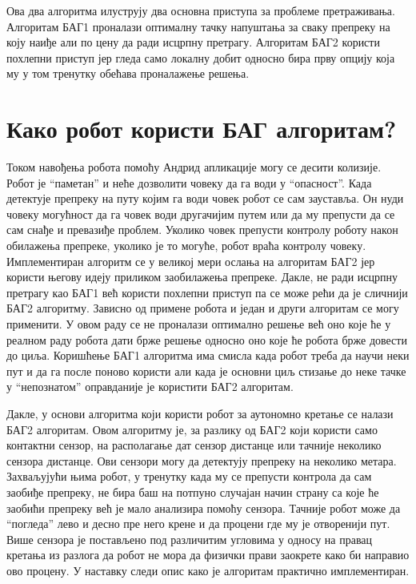 \documentclass[12pt,oneside]{memoir}
\theoremstyle{remark}
\begin{document}
Ова два алгоритма илуструју два основна приступа за проблеме претраживања. Алгоритам БАГ1 проналази оптималну тачку напуштања за сваку препреку на коју наиђе али по цену да ради исцрпну претрагу. Алгоритам БАГ2 користи похлепни приступ јер гледа само локалну добит односно бира прву опцију која му у том тренутку обећава проналажење решења.

\section{Како робот користи БАГ алгоритам?}
Током навођења робота помоћу Андрид апликације могу се десити колизије. Робот је ``паметан'' и неће дозволити човеку да га води у ``опасност''. Када детектује препреку на путу којим га води човек робот се сам зауставља. Он нуди човеку могућност да га човек води другачијим путем или да му препусти да се сам снађе и превазиђе проблем. Уколико човек препусти контролу роботу након обилажења препреке, уколико је то могуће, робот враћа контролу човеку. Имплементиран алгоритм се у великој мери ослања на алгоритам  БАГ2 јер користи његову идеју приликом заобилажења препреке. Дакле, не ради исцрпну претрагу као БАГ1 већ користи похлепни приступ па се може рећи да је сличнији БАГ2 алгоритму. Зависно од примене робота и један и други алгоритам се могу применити. У овом раду се не проналази оптимално решење већ оно које ће у реалном раду робота дати брже решење односно оно које ће робота брже довести до циља. Коришћење БАГ1 алгоритма има смисла када робот треба да научи неки пут и да га после поново користи али када је основни циљ стизање до неке тачке у ``непознатом'' оправданије је користити БАГ2 алгоритам.

Дакле, у основи алгоритма који користи робот за аутономно кретање се налази БАГ2 алгоритам. Овом алгоритму је, за разлику од БАГ2 који користи само контактни сензор, на располагање дат сензор дистанце или тачније неколико сензора дистанце. Ови сензори могу да детектују препреку на неколико метара. Захваљујући њима робот, у тренутку када му се препусти контрола да сам заобиђе препреку, не бира баш на потпуно случајан начин страну са које ће заобићи препреку већ је мало анализира помоћу сензора. Тачније робот може да ``погледа'' лево и десно пре него крене и да процени где му је отворенији пут. Више сензора је постављено под различитим угловима у односу на правац кретања из разлога да робот не мора да физички прави заокрете како би направио ово процену. У наставку следи опис како је алгоритам практично имплементиран.
\end{document}
